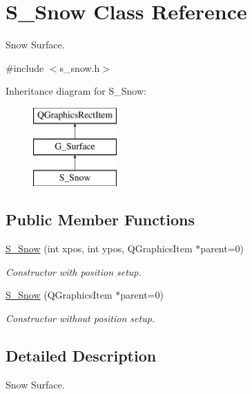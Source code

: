 \hypertarget{class_s___snow}{}\section{S\+\_\+\+Snow Class Reference}
\label{class_s___snow}


Snow Surface.  




{\ttfamily \#include $<$s\+\_\+snow.\+h$>$}

Inheritance diagram for S\+\_\+\+Snow\+:\begin{figure}[H]
\begin{center}
\leavevmode
\includegraphics[height=3.000000cm]{class_s___snow}
\end{center}
\end{figure}
\subsection*{Public Member Functions}
\begin{DoxyCompactItemize}
\item 
\hyperlink{class_s___snow_a58b5eb7552b3082d105e9968acc7a9fb}{S\+\_\+\+Snow} (int xpos, int ypos, Q\+Graphics\+Item $\ast$parent=0)
\begin{DoxyCompactList}\small\item\em Constructor with position setup. \end{DoxyCompactList}\item 
\hyperlink{class_s___snow_a19a17d0be19ecb0f85b1feff5aab697f}{S\+\_\+\+Snow} (Q\+Graphics\+Item $\ast$parent=0)
\begin{DoxyCompactList}\small\item\em Constructor without position setup. \end{DoxyCompactList}\end{DoxyCompactItemize}


\subsection{Detailed Description}
Snow Surface. 

